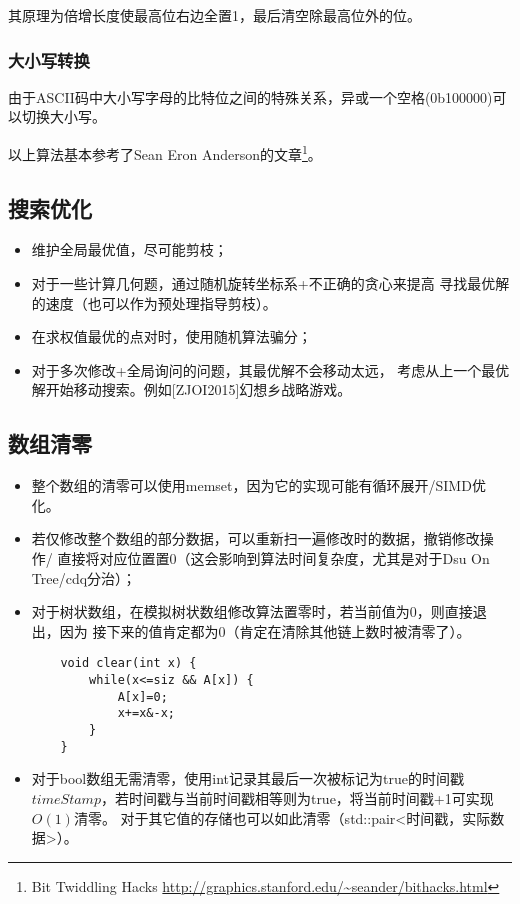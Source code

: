 其原理为倍增长度使最高位右边全置1，最后清空除最高位外的位。
\subsubsection{大小写转换}
由于ASCII码中大小写字母的比特位之间的特殊关系，异或一个空格(0b100000)可以切换大小写。

以上算法基本参考了Sean Eron Anderson的文章\footnote{
    Bit Twiddling Hacks
    \url{http://graphics.stanford.edu/\~seander/bithacks.html}
}。
\subsection{搜索优化}
\begin{itemize}
    \item 维护全局最优值，尽可能剪枝；
    \item 对于一些计算几何题，通过随机旋转坐标系+不正确的贪心来提高
    寻找最优解的速度（也可以作为预处理指导剪枝）。
    \item 在求权值最优的点对时，使用随机算法骗分；
    \item 对于多次修改+全局询问的问题，其最优解不会移动太远，
    考虑从上一个最优解开始移动搜索。例如[ZJOI2015]幻想乡战略游戏。
\end{itemize}
\subsection{数组清零}
\begin{itemize}
    \item 整个数组的清零可以使用memset，因为它的实现可能有循环展开/SIMD优化。
    \item 若仅修改整个数组的部分数据，可以重新扫一遍修改时的数据，撤销修改操作/
    直接将对应位置置0（这会影响到算法时间复杂度，尤其是对于Dsu On Tree/cdq分治）；
    \item 对于树状数组，在模拟树状数组修改算法置零时，若当前值为0，则直接退出，因为
    接下来的值肯定都为0（肯定在清除其他链上数时被清零了）。
    \begin{lstlisting}
    void clear(int x) {
        while(x<=siz && A[x]) {
            A[x]=0;
            x+=x&-x;
        }
    }
    \end{lstlisting}
    \item 对于bool数组无需清零，使用int记录其最后一次被标记为true的时间戳
    $timeStamp$，若时间戳与当前时间戳相等则为true，将当前时间戳+1可实现$O(1)$清零。
    对于其它值的存储也可以如此清零（std::pair<时间戳，实际数据>）。
\end{itemize}
